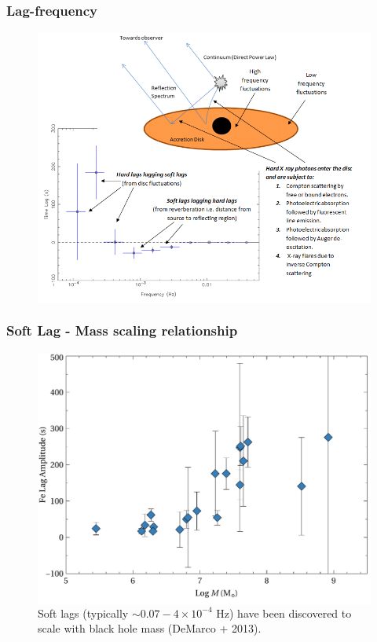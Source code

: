 \documentclass[]{beamer}
\begin{document}
\begin{frame}
\frametitle{Lag-frequency}
\begin{figure}\centering
\colorbox{white}{\includegraphics[scale=.45]{lags_explained.png}}\\
\end{figure}
\end{frame}

\begin{frame}
\frametitle{Soft Lag - Mass scaling relationship}
\begin{figure}\centering
\colorbox{white}{\includegraphics[scale=.40]{Fe_Lag_V_BHmass.pdf}}\\
Soft lags (typically $\sim 0.07 - 4 \times 10^{-4}$ Hz) have been discovered to scale with black hole mass (DeMarco + 2013).
\end{figure}
\end{frame}
\end{document}
